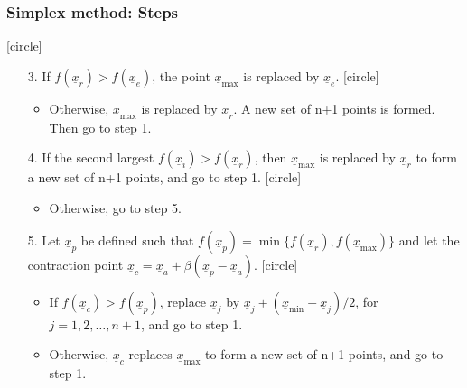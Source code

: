 \documentclass{beamer}
\begin{document}
\begin{frame}
    \frametitle{Simplex method: Steps}
    [circle]
    \begin{enumerate}
        \item[3.] If $f(\underline{x}_r)>f(\underline{x}_e)$, the point $\underline{x}_{\max}$ is replaced by $\underline{x}_e$.
        [circle]
        \begin{itemize}
            \item Otherwise, $\underline{x}_{\max}$ is replaced by $\underline{x}_r$.
            A new set of n+1 points is formed. Then go to step 1.
        \end{itemize}
        \item[4.]If the second largest $f(\underline{x}_i)>f(\underline{x}_{r})$,
         then $\underline{x}_{\max}$ is replaced by $\underline{x}_r$ to form a new set of n+1 points,
         and go to step 1.
         [circle]
         \begin{itemize}
             \item Otherwise, go to step 5.
         \end{itemize}
        \item[5.] Let $\underline{x}_p$ be defined such that $f(\underline{x}_p)=\min{\{f(\underline{x}_r), f(\underline{x}_{\max})\}}$
        and let the contraction point $\underline{x}_c=\underline{x}_a+\beta (\underline{x}_p-\underline{x}_a)$.
        [circle]
        \begin{itemize}
            \item If $f(\underline{x}_c)>f(\underline{x}_p)$, replace $\underline{x}_j$ by $\underline{x}_j+(\underline{x}_{\min}-\underline{x}_j)/2$, for $j=1,2,\dots,n+1$, and go to step 1.
            \item Otherwise, $\underline{x}_c$ replaces $\underline{x}_{\max}$ to form a new set of n+1 points, and go to step 1.
        \end{itemize}
    \end{enumerate}
    
\end{frame}
\end{document}
